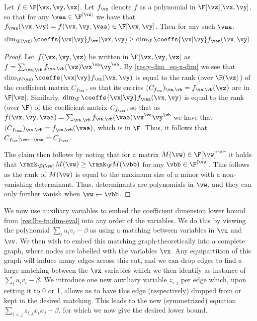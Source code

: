 \documentclass{toc}
\begin{document}
\begin{lemma}\label{res:coeff-dim:fraction-field}
        Let $f\in\F[\vx,\vy,\vz]$. Let $f_\vz$ denote $f$ as a polynomial in $\F[\vz][\vx,\vy]$, so that for any $\vaa\in\F^{|\vz|}$ we have that $f_\vaa(\vx,\vy)=f(\vx,\vy,\vaa) \in\F[\vx,\vy]$.  Then for any such $\vaa$,
        \[
                \dim_{\F(\vz)}\coeffs{\vx|\vy} f_\vz(\vx,\vy) \ge \dim_\F \coeffs{\vx|\vy}f_\vaa(\vx,\vy)
                \;.
        \]
\end{lemma}
\begin{proof}
        Let $f(\vx,\vy,\vz)$ be written in $\F[\vx,\vy,\vz]$ as $f=\sum_{\va,\vb} f_{\va,\vb} (\vz)\vx^\va\vy^\vb$. By \autoref{res:y-dim_eq-x-dim} we see that $\dim_{\F(\vz)}\coeffs{\vx|\vy} f_\vz(\vx,\vy)$ is equal to the rank (over $\F(\vz)$) of the coefficient matrix $C_{f_\vz}$, so that its entries $(C_{f_\vz})_{\va,\vb}=f_{\va,\vb}(\vz)$ are in $\F[\vz]$.  Similarly, $\dim_{\F}\coeffs{\vx|\vy} f_\vaa(\vx,\vy)$ is equal to the rank (over $\F$) of the coefficient matrix $C_{f_\vaa}$, so that as $f(\vx,\vy,\vaa)= \sum_{\va,\vb} f_{\va,\vb}(\vaa)\vx^\va\vy^\vb$ we have that $(C_{f_\vaa})_{\va,\vb}=f_{\va,\vb}(\vaa)$, which is in $\F$.  Thus, it follows that $C_{f_\vz}|_{\vz\leftarrow\vaa}=C_{f_\vaa}$.

        The claim then follows by noting that for a matrix $M(\vw)\in\F[\vw]^{r\times r}$ it holds that $\rank_{\F(\vw)} M(\vw)\ge \rank_{\F} M(\vbb)$ for any $\vbb\in\F^{|\vw|}$. This follows as the rank of $M(\vw)$ is equal to the maximum size of a minor with a non-vanishing determinant.  Thus,  determinants are polynomials in $\vw$, and they can only further vanish when $\vw\leftarrow\vbb$. %
%
%
\end{proof}

We now use auxiliary variables to embed the coefficient dimension lower bound from \autoref{res:lbs-fn:dim-eval} into any order of the variables.  We do this by viewing the polynomial $\sum_i u_iv_i-\beta$ as using a matching between variables in $\vu$ and $\vv$.  We then wish to embed this matching graph-theoretically into a complete graph, where nodes are labelled with the variables $\vx$.  Any equipartition of this graph will induce many edges across this cut, and we can drop edges to find a large matching between the $\vx$ variables which we then identify as instance of $\sum_i u_iv_i-\beta$.  We introduce one new auxiliary variable $z_{i,j}$ per edge which, upon setting it to 0 or 1, allows us to have this edge (respectively) dropped from or kept in the desired matching.  This leads to the new (symmetrized) equation $\sum_{i<j} z_{i,j} x_ix_j-\beta$, for which we now give the desired lower bound.
\end{document}
